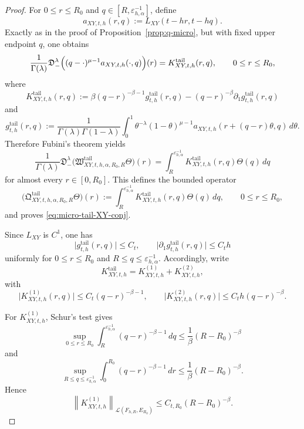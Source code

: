 \documentclass[11pt,a4paper]{amsart}
\theoremstyle{plain}
\theoremstyle{definition}
\theoremstyle{remark}
\begin{document}
\begin{proof}
For \(0\le r\le R_0\) and \(q\in[R,\varepsilon_{h,\alpha}^{-1}]\), define
\[
a_{XY,t,h}(r,q):=L_{XY}(t-hr,t-hq).
\]
Exactly as in the proof of Proposition~\ref{prop:q-micro}, but with fixed upper endpoint \(q\),
one obtains
\[
\frac{1}{\Gamma(\lambda)}
\mathfrak D_-^\lambda
\Bigl(
(q-\cdot)^{\mu-1}a_{XY,t,h}(\cdot,q)
\Bigr)(r)
=
K_{XY,t,h}^{\mathrm{tail}}(r,q),
\qquad 0\le r\le R_0,
\]
where
\[
K_{XY,t,h}^{\mathrm{tail}}(r,q)
:=
\beta (q-r)^{-\beta-1}g_{t,h}^{\mathrm{tail}}(r,q)
-
(q-r)^{-\beta}\partial_1 g_{t,h}^{\mathrm{tail}}(r,q)
\]
and
\[
g_{t,h}^{\mathrm{tail}}(r,q)
:=
\frac{1}{\Gamma(\lambda)\Gamma(1-\lambda)}
\int_0^1
\theta^{-\lambda}(1-\theta)^{\mu-1}
a_{XY,t,h}(r+(q-r)\theta,q)\,d\theta.
\]
Therefore Fubini's theorem yields
\[
\frac{1}{\Gamma(\lambda)}
\mathfrak D_-^\lambda
\bigl(
\mathfrak W_{XY,t,h,\alpha,R_0,R}^{\mathrm{tail}}\Theta
\bigr)(r)
=
\int_R^{\varepsilon_{h,\alpha}^{-1}}
K_{XY,t,h}^{\mathrm{tail}}(r,q)\Theta(q)\,dq
\]
for almost every \(r\in[0,R_0]\). This defines the bounded operator
\[
\bigl(
\mathfrak Q_{XY,t,h,\alpha,R_0,R}^{\mathrm{tail}}\Theta
\bigr)(r)
:=
\int_R^{\varepsilon_{h,\alpha}^{-1}}
K_{XY,t,h}^{\mathrm{tail}}(r,q)\Theta(q)\,dq,
\qquad 0\le r\le R_0,
\]
and proves \eqref{eq:micro-tail-XY-conj}.

Since \(L_{XY}\) is \(C^1\), one has
\[
\bigl|g_{t,h}^{\mathrm{tail}}(r,q)\bigr|\le C_t,
\qquad
\bigl|\partial_1 g_{t,h}^{\mathrm{tail}}(r,q)\bigr|\le C_t h
\]
uniformly for \(0\le r\le R_0\) and \(R\le q\le \varepsilon_{h,\alpha}^{-1}\). Accordingly, write
\[
K_{XY,t,h}^{\mathrm{tail}}=K_{XY,t,h}^{(1)}+K_{XY,t,h}^{(2)},
\]
with
\[
\bigl|K_{XY,t,h}^{(1)}(r,q)\bigr|
\le
C_t (q-r)^{-\beta-1},
\qquad
\bigl|K_{XY,t,h}^{(2)}(r,q)\bigr|
\le
C_t h (q-r)^{-\beta}.
\]

For \(K_{XY,t,h}^{(1)}\), Schur's test gives
\[
\sup_{0\le r\le R_0}\int_R^{\varepsilon_{h,\alpha}^{-1}} (q-r)^{-\beta-1}\,dq
\le
\frac{1}{\beta}(R-R_0)^{-\beta}
\]
and
\[
\sup_{R\le q\le \varepsilon_{h,\alpha}^{-1}}
\int_0^{R_0} (q-r)^{-\beta-1}\,dr
\le
\frac{1}{\beta}(R-R_0)^{-\beta}.
\]
Hence
\begin{equation}\label{eq:micro-tail-XY-main}
\left\|
K_{XY,t,h}^{(1)}
\right\|_{\mathcal L(F_{h,R},E_{R_0})}
\le
C_{t,R_0}(R-R_0)^{-\beta}.
\end{equation}


\end{proof}
\end{document}
